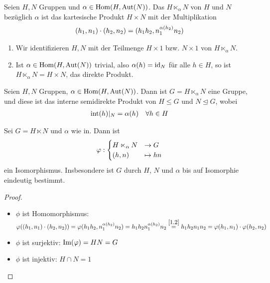 \begin{definition}
	Seien $H,N$ Gruppen und $\alpha\in\Hom(H,\Aut(N))$. Das  $H\ltimes_{\alpha}N$ von $H$ und $N$ bezüglich $\alpha$ ist das kartesische Produkt $H\times N$ mit der Multiplikation
	\begin{align}
		(h_1,n_1)\cdot (h_2,n_2) = (h_1h_2,n_1^{\alpha(h_2)}n_2)\notag
	\end{align}
\end{definition}

\begin{remark}
	\begin{enumerate}[label=(\alph*)]
		\item Wir identifizieren $H,N$ mit der Teilmenge $H\times 1$ bzw. $N\times 1$ von $H\ltimes_{\alpha} N$.
		\item Ist $\alpha\in\Hom(H,\Aut(N))$ trivial, also $\alpha(h)=\id_N$ für alle $h\in H$, so ist $H\ltimes_{\alpha} N=H \times N$, das direkte Produkt.
	\end{enumerate}
\end{remark}

\begin{proposition}
	Seien $H,N$ Gruppen, $\alpha\in\Hom(H,\Aut(N))$. Dann ist $G=H\ltimes_{\alpha} N$ eine Gruppe, und diese ist das interne semidirekte Produkt von $H\le G$ und $N\unlhd G$, wobei
	\begin{align}
		\Int(h)\vert_N = \alpha(h)\quad\forall h\in H\notag
	\end{align}
\end{proposition}

\begin{conclusion}
	Sei $G=H\ltimes N$ und $\alpha$ wie in. Dann ist
	\begin{align}
		\phi :\begin{cases}
		H\ltimes_{\alpha} N &\to G \\ (h,n) &\mapsto hn
		\end{cases}\notag
	\end{align}
	ein Isomorphismus. Insbesondere ist $G$ durch $H$, $N$ und $\alpha$ bis auf Isomorphie eindeutig bestimmt.
\end{conclusion}
\begin{proof}
	\begin{itemize}
		\item $\phi$ ist Homomorphismus: $\phi((h_1,n_1)\cdot (h_2,n_2)) = \phi(h_1h_2,n_1^{\alpha(h_2)}n_2) = h_1h_2n_1^{\alpha(h_2)}n_2 \overset{\eqref{1.2}}{=} h_1h_2n_1n_2 = \phi(h_1,n_1)\cdot \phi(h_2,n_2)$
		\item $\phi$ ist surjektiv: $\Image(\phi)=HN=G$
		\item $\phi$ ist injektiv: $H\cap N=1$
	\end{itemize}
\end{proof}

